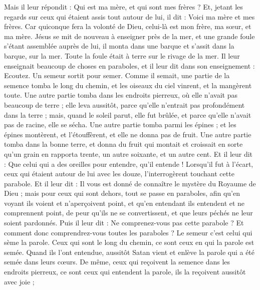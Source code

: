 \begin{multicols}{2}
Mais il leur répondit : Qui est ma mère, et qui sont mes frères ?
Et, jetant les regards sur ceux qui étaient assis tout autour de lui, il dit : Voici ma mère et mes frères.
Car quiconque fera la volonté de Dieu, celui-là est mon frère, ma sœur, et ma mère.
\VerseOne{}Jésus se mit de nouveau à enseigner près de la mer, et une grande foule s’étant assemblée auprès de lui, il monta dans une barque et s’assit dans la barque, sur la mer. Toute la foule était à terre sur le rivage de la mer.
Il leur enseignait beaucoup de choses en paraboles, et il leur dit dans son enseignement :
Ecoutez. Un semeur sortit pour semer.
Comme il semait, une partie de la semence tomba le long du chemin, et les oiseaux du ciel vinrent, et la mangèrent toute.
Une autre partie tomba dans les endroits pierreux, où elle n'avait pas beaucoup de terre ; elle leva aussitôt, parce qu'elle n'entrait pas profondément dans la terre ;
mais, quand le soleil parut, elle fut brûlée, et parce qu'elle n'avait pas de racine, elle se sécha.
Une autre partie tomba parmi les épines ; et les épines montèrent, et l'étouffèrent, et elle ne donna pas de fruit.
Une autre partie tomba dans la bonne terre, et donna du fruit qui montait et croissait en sorte qu'un grain en rapporta trente, un autre soixante, et un autre cent.
Et il leur dit : Que celui qui a des oreilles pour entendre, qu'il entende !
Lorsqu’il fut à l’écart, ceux qui étaient autour de lui avec les douze, l'interrogèrent touchant cette parabole.
Et il leur dit : Il vous est donné de connaître le mystère du Royaume de Dieu ; mais pour ceux qui sont dehors, tout se passe en paraboles,
afin qu'en voyant ils voient et n'aperçoivent point, et qu'en entendant ils entendent et ne comprennent point, de peur qu'ils ne se convertissent, et que leurs péchés ne leur soient pardonnés.
Puis il leur dit : Ne comprenez-vous pas cette parabole ? Et comment donc comprendrez-vous toutes les paraboles ?
Le semeur c'est celui qui sème la parole.
Ceux qui sont le long du chemin, ce sont ceux en qui la parole est semée. Quand ils l’ont entendue, aussitôt Satan vient et enlève la parole qui a été semée dans leurs cœurs.
De même, ceux qui reçoivent la semence dans les endroits pierreux, ce sont ceux qui entendent la parole, ils la reçoivent aussitôt avec joie ;

\end{multicols}
